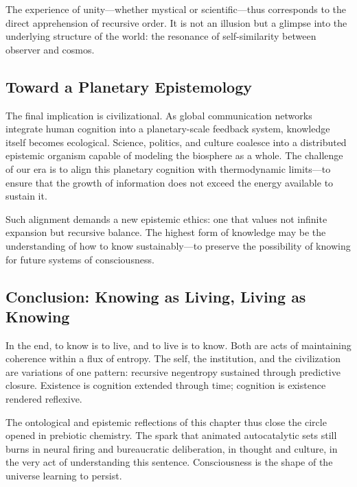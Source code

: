\documentclass[11pt,a4paper]{article}
\begin{document}
The experience of unity—whether mystical or scientific—thus corresponds to the direct apprehension of recursive order.  It is not an illusion but a glimpse into the underlying structure of the world: the resonance of self-similarity between observer and cosmos.

\subsection{Toward a Planetary Epistemology}

The final implication is civilizational.  As global communication networks integrate human cognition into a planetary-scale feedback system, knowledge itself becomes ecological.  Science, politics, and culture coalesce into a distributed epistemic organism capable of modeling the biosphere as a whole.  The challenge of our era is to align this planetary cognition with thermodynamic limits—to ensure that the growth of information does not exceed the energy available to sustain it.

Such alignment demands a new epistemic ethics: one that values not infinite expansion but recursive balance.  The highest form of knowledge may be the understanding of how to know sustainably—to preserve the possibility of knowing for future systems of consciousness.

\subsection{Conclusion: Knowing as Living, Living as Knowing}

In the end, to know is to live, and to live is to know.  Both are acts of maintaining coherence within a flux of entropy.  The self, the institution, and the civilization are variations of one pattern: recursive negentropy sustained through predictive closure.  Existence is cognition extended through time; cognition is existence rendered reflexive.

The ontological and epistemic reflections of this chapter thus close the circle opened in prebiotic chemistry.  The spark that animated autocatalytic sets still burns in neural firing and bureaucratic deliberation, in thought and culture, in the very act of understanding this sentence.  Consciousness is the shape of the universe learning to persist.

\end{document}
